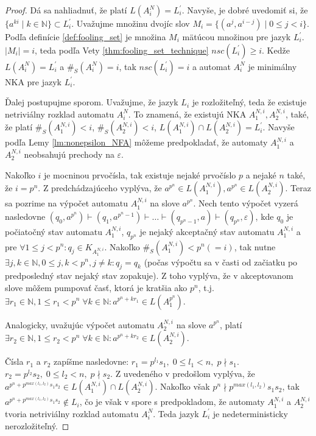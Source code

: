 \begin{proof}
Dá sa nahliadnuť, že platí $ L(A_i^N) = L^{\prime}_i $. Navyše, je dobré uvedomiť si, že $ \lbrace a^{ki} \; | \; k \in \mathbb{N} \rbrace \subset L^{\prime}_i $. Uvažujme množinu dvojíc slov $ M_i = \lbrace (a^j,a^{i-j}) \; | \; 0 \leq j < i  \rbrace $. Podľa definície \ref{def:fooling_set} je množina $ M_i $ mätúcou množinou pre jazyk $ L^{\prime}_i $. $ |M_i|=i $, teda podľa Vety \ref{thm:fooling_set_technique} $ nsc(L^{\prime}_i) \geq i $. Kedže $ L(A_i^N) = L^{\prime}_i $ a $ \#_S(A_i^N) = i $, tak $nsc(L^{\prime}_i) = i $ a automat $ A_i^N $ je minimálny NKA pre jazyk $ L^{\prime}_i $.
\par
Ďalej postupujme sporom. Uvažujme, že jazyk $ L_{i} $ je rozložiteľný, teda že existuje netriviálny rozklad automatu $ A_i^N $. To znamená, že existujú NKA $ A_1^{N,i}, A_2^{N,i} $, také, že platí $ \#_S(A_1^{N,i}) < i $, $ \#_S(A_2^{N,i}) < i $, $ L(A_1^{N,i}) \cap L(A_2^{N,i}) = L^{\prime}_i $. Navyše podľa Lemy \ref{lm:nonepsilon_NFA} môžeme predpokladať, že automaty $ A_1^{N,i}$ a $ A_2^{N,i} $ neobsahujú prechody na $ \varepsilon $. 
\par
Nakoľko $ i $ je mocninou prvočísla, tak existuje nejaké prvočíslo $ p $ a nejaké $ n $ také, že $ i=p^n $. Z predchádzajúceho vyplýva, že $ a^{p^n} \in L(A_1^{N,i}), a^{p^n} \in L(A_2^{N,i})$. Teraz sa pozrime na výpočet automatu $ A_1^{N,i} $ na slove $ a^{p^n} $. Nech tento výpočet vyzerá nasledovne $ (q_0,a^{p^n}) \vdash (q_1,a^{p^n-1}) \vdash \dots \vdash (q_{p^n-1},a) \vdash (q_{p^n},\varepsilon) $, kde $ q_0 $ je počiatočný stav automatu $ A_1^{N,i} $, $ q_{p^n} $ je nejaký akceptačný stav automatu $ A_1^{N,i} $ a pre $ \forall 1 \leq j < p^n : q_j \in K_{A_1^{N,i}}$. Nakoľko $ \#_S(A_1^{N,i}) < p^n(=i) $, tak nutne $ \exists j,k \in \mathbb{N}, 0 \leq j,k < p^n, j \neq k: q_j = q_k $ (počas výpočtu sa v časti \glqq{}od začiatku po predposledný stav\grqq{} nejaký stav zopakuje). Z toho vyplýva, že v akceptovanom slove môžem pumpovať časť, ktorá je kratšia ako $ p^n $, t.j. $ \exists r_1 \in \mathbb{N}, 1 \leq r_1 < p^n \; \forall k \in \mathbb{N}: a^{p^n+kr_1} \in L(A_1^{p^n})$. 
\par
Analogicky, uvažujúc výpočet automatu $ A_2^{N,i} $ na slove $ a^{p^n} $, platí $ \exists r_2 \in \mathbb{N}, 1 \leq r_2 < p^n \; \forall k \in \mathbb{N}: a^{p^n+kr_2} \in L(A_2^{N,i})$.
\par
Čísla $ r_1 $ a $ r_2 $ zapíšme nasledovne: $ r_1 = p^{l_1}s_1, \; 0 \leq l_1 < n, \; p \nmid s_1 $. $ r_2 = p^{l_2}s_2, \; 0 \leq l_2 < n, \; p \nmid s_2 $. Z uvedeného v predošlom vyplýva, že $ a^{p^n + p^{max(l_1,l_2)}s_1s_2} \in L(A_1^{N,i}) \cap L(A_2^{N,i}) $. Nakoľko však $ p^n \nmid p^{max(l_1,l_2)}s_1s_2$, tak $ a^{p^n + p^{max(l_1,l_2)}s_1s_2} \notin L_{i} $, čo je však v spore s predpokladom, že automaty $ A_1^{N,i} $ a $ A_2^{N,i} $ tvoria netriviálny rozklad automatu $ A_{i}^N $. Teda jazyk $ L^{\prime}_i $ je nedeterministicky nerozložiteľný.

\end{proof}
